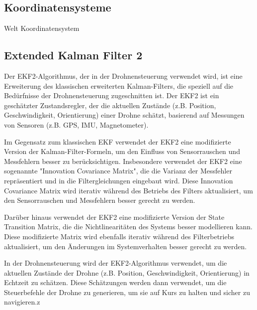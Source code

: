     \subsection{Koordinatensysteme}

\begin{description}
    \item[Welt Koordinatensystem] 
\end{description}



    \cite[vgl. ]{SWB-1841134112}

 \subsection{Extended Kalman Filter 2}
    Der \ac{EKF}2-Algorithmus, der in der Drohnensteuerung verwendet wird, ist eine Erweiterung des klassischen erweiterten Kalman-Filters, die speziell auf die Bedürfnisse der Drohnensteuerung zugeschnitten ist. Der EKF2 ist ein geschätzter Zustandsregler, der die aktuellen Zustände (z.B. Position, Geschwindigkeit, Orientierung) einer Drohne schätzt, basierend auf Messungen von Sensoren (z.B. \ac{GPS}, \ac{IMU}, Magnetometer).

Im Gegensatz zum klassischen EKF verwendet der EKF2 eine modifizierte Version der Kalman-Filter-Formeln, um den Einfluss von Sensorrauschen und Messfehlern besser zu berücksichtigen. Insbesondere verwendet der EKF2 eine sogenannte "Innovation Covariance Matrix", die die Varianz der Messfehler repräsentiert und in die Filtergleichungen eingebaut wird. Diese Innovation Covariance Matrix wird iterativ während des Betriebs des Filters aktualisiert, um den Sensorrauschen und Messfehlern besser gerecht zu werden.

Darüber hinaus verwendet der EKF2 eine modifizierte Version der State Transition Matrix, die die Nichtlinearitäten des Systems besser modellieren kann. Diese modifizierte Matrix wird ebenfalls iterativ während des Filterbetriebs aktualisiert, um den Änderungen im Systemverhalten besser gerecht zu werden.

In der Drohnensteuerung wird der EKF2-Algorithmus verwendet, um die aktuellen Zustände der Drohne (z.B. Position, Geschwindigkeit, Orientierung) in Echtzeit zu schätzen. Diese Schätzungen werden dann verwendet, um die Steuerbefehle der Drohne zu generieren, um sie auf Kurs zu halten und sicher zu navigieren.z
    
